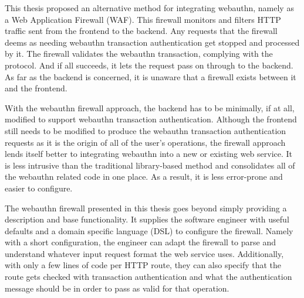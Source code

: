 This thesis proposed an alternative method for integrating webauthn, namely as a Web Application Firewall (WAF). This firewall monitors and filters HTTP traffic sent from the frontend to the backend. Any requests that the firewall deems as needing webauthn transaction authentication get stopped and processed by it. The firewall validates the webauthn transaction, complying with the protocol. And if all succeeds, it lets the request pass on through to the backend. As far as the backend is concerned, it is unaware that a firewall exists between it and the frontend. 

With the webauthn firewall approach, the backend has to be minimally, if at all, modified to support webauthn transaction authentication. Although the frontend still needs to be modified to produce the webauthn transaction authentication requests as it is the origin of all of the user's operations, the firewall approach lends itself better to integrating webauthn into a new or existing web service. It is less intrusive than the traditional library-based method and consolidates all of the webauthn related code in one place. As a result, it is less error-prone and easier to configure. 




The webauthn firewall presented in this thesis goes beyond simply providing a description and base functionality. It supplies the software engineer with useful defaults and a domain specific language (DSL) to configure the firewall. Namely with a short configuration, the engineer can adapt the firewall to parse and understand whatever input request format the web service uses. Additionally, with only a few lines of code per HTTP route, they can also specify that the route gets checked with transaction authentication and what the authentication message should be in order to pass as valid for that operation. 



